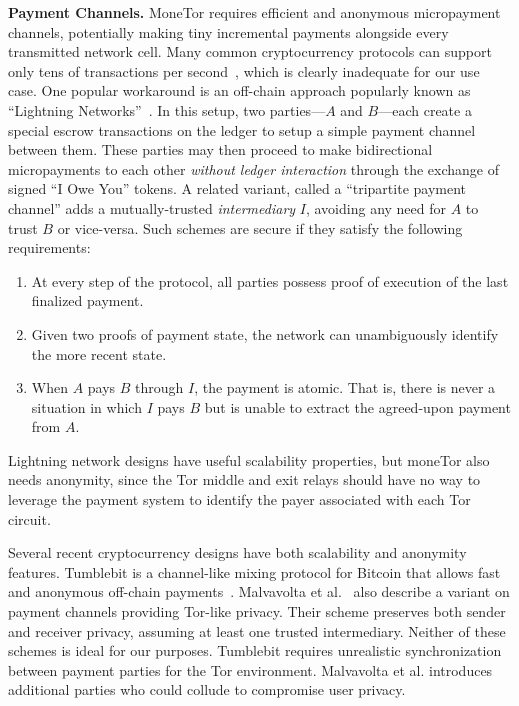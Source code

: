 \medskip \noindent\textbf{Payment Channels.}
MoneTor requires efficient and anonymous micropayment channels, potentially making tiny incremental payments alongside every transmitted network cell.
Many common cryptocurrency protocols can support only tens of transactions per second~\cite{team2018blockchain}, which is clearly inadequate for our use case.
One popular workaround is an off-chain approach popularly known as ``Lightning Networks''~\cite{poon2016bitcoin}.
In this setup, two parties---$A$ and $B$---each create a special escrow transactions on the ledger to setup a simple payment channel between them.
These parties may then proceed to make bidirectional micropayments to each other \emph{without ledger interaction} through the exchange of signed ``I Owe You'' tokens.
A related variant, called a ``tripartite payment channel'' adds a mutually-trusted {\em intermediary} $I$, avoiding any need for $A$ to trust $B$ or vice-versa.
Such schemes are secure if they satisfy the following requirements:

\begin{enumerate}
\item At every step of the protocol, all parties possess proof of execution of the last finalized payment.
\item Given two proofs of payment state, the network can unambiguously identify the more recent state.
\item When $A$ pays $B$ through $I$, the payment is atomic.
      That is, there is never a situation in which $I$ pays $B$ but is unable to extract the agreed-upon payment from $A$.
\end{enumerate}

Lightning network designs have useful scalability properties, but moneTor also needs anonymity, since the Tor middle and exit relays should have no way to leverage the payment system to identify the payer associated with each Tor circuit.

Several recent cryptocurrency designs have both scalability and anonymity features.
Tumblebit is a channel-like mixing protocol for Bitcoin that allows fast and anonymous off-chain payments~\cite{heilman2017tumblebit}.
Malvavolta et al.~\cite{malavolta2017concurrency} also describe a variant on payment channels providing Tor-like privacy.
Their scheme preserves both sender and receiver privacy, assuming at least one trusted intermediary.
Neither of these schemes is ideal for our purposes.
Tumblebit requires unrealistic synchronization between payment parties for the Tor environment.
Malvavolta et al. introduces additional parties who could collude to compromise user privacy.

